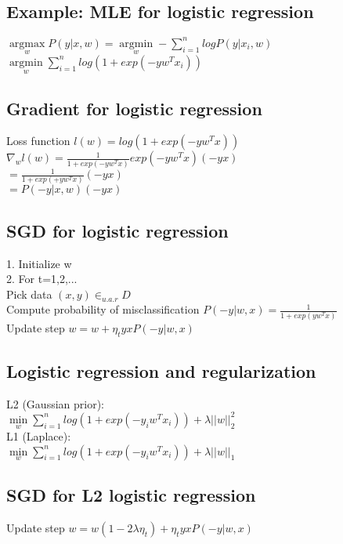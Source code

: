 \subsection*{Example: MLE for logistic regression}
$\underset{w}{\operatorname{argmax}} P(y|x,w) = \underset{w}{\operatorname{argmin}} - \sum_{i=1}^n log P(y|x_i,w)$\\
$\underset{w}{\operatorname{argmin}} \sum_{i=1}^n log(1+exp(-yw^Tx_i))$

\subsection*{Gradient for logistic regression}
Loss function $l(w) = log(1+exp(-yw^Tx))$\\
$\nabla_w l(w) = \frac{1}{1+exp(-yw^Tx)} exp(-yw^Tx) (-yx)$\\
$=\frac{1}{1+exp(+yw^Tx)} (-yx)$\\
$=P(-y|x,w) (-yx)$

\subsection*{SGD for logistic regression}
1. Initialize w\\
2. For t=1,2,...\\
Pick data $(x,y) \in_{u.a.r} D$\\
Compute probability of misclassification $P(-y|w,x) = \frac{1}{1+exp(yw^Tx)}$\\
Update step $w = w + \eta_t y x P(-y|w,x)$

\subsection*{Logistic regression and regularization}
L2 (Gaussian prior):\\
$\underset{w}{\operatorname{min}} \sum_{i=1}^n log(1+exp(-y_i w^T x_i)) + \lambda ||w||_2^2$\\
L1 (Laplace):\\
$\underset{w}{\operatorname{min}} \sum_{i=1}^n log(1+exp(-y_i w^T x_i)) + \lambda ||w||_1$\\

\subsection*{SGD for L2 logistic regression}
Update step $w = w(1-2\lambda \eta_t) + \eta_t y x P(-y|w,x)$